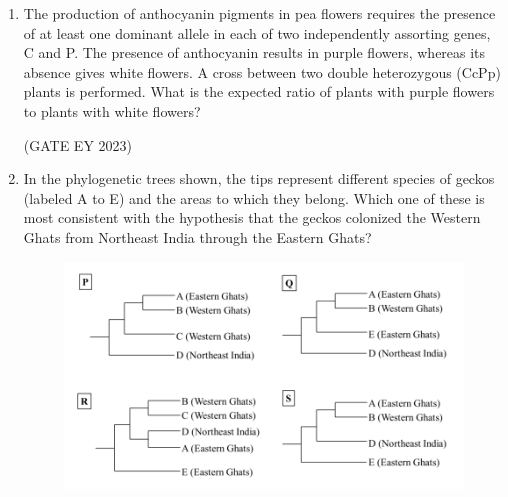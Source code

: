 \documentclass[journal,12pt,onecolumn]{IEEEtran}
\theoremstyle{remark}
\begin{document}
\begin{enumerate}
\begin{enumerate}
\begin{multicols}{4}
\end{multicols}
\end{enumerate}

\hfill{(GATE EY 2023)}

 \item The production of anthocyanin pigments in pea flowers requires the presence of
at least one dominant allele in each of two independently assorting genes, C and P.
The presence of anthocyanin results in purple flowers, whereas its absence gives
white flowers. A cross between two double heterozygous (CcPp) plants is
performed. What is the expected ratio of plants with purple flowers to plants with
white flowers?
\begin{enumerate}
\end{enumerate}

\hfill{(GATE EY 2023)}



 \item In the phylogenetic trees shown, the tips represent different species of geckos
(labeled A to E) and the areas to which they belong. Which one of these is most
consistent with the hypothesis that the geckos colonized the Western Ghats from
Northeast India through the Eastern Ghats?
\begin{figure}[H]
    \centering
    \includegraphics[]{figs/Q.45.png}
    \caption{}
    \label{fig:7}
\end{figure}
\begin{enumerate}
\begin{multicols}{4}



\end{multicols}
\end{enumerate}
\end{enumerate}
\end{document}

